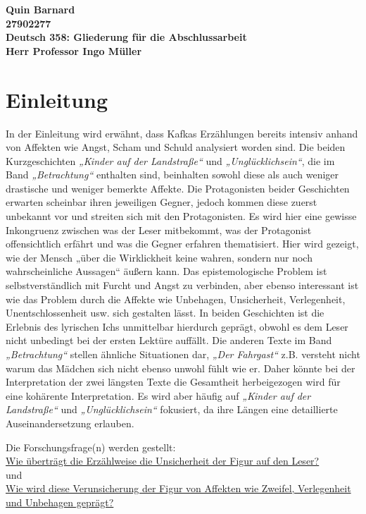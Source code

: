 \documentclass[12pt,a4paper]{article}
\begin{document}
\onehalfspacing


\noindent
\textbf{%
    Quin Barnard\\
    27902277\\
    Deutsch 358: Gliederung für die Abschlussarbeit\\
    Herr Professor Ingo Müller
}

\par
\section{Einleitung}
In der Einleitung wird erwähnt, dass Kafkas Erzählungen bereits intensiv anhand von Affekten wie Angst, Scham und Schuld analysiert worden sind. Die beiden Kurzgeschichten \textit{„Kinder auf der Landstraße“} und \textit{„Unglücklichsein“}, die im Band \textit{„Betrachtung“} enthalten sind, beinhalten sowohl diese als auch weniger drastische und weniger bemerkte Affekte. Die Protagonisten beider Geschichten erwarten scheinbar ihren jeweiligen Gegner, jedoch kommen diese zuerst unbekannt vor und streiten sich mit den Protagonisten. Es wird hier eine gewisse Inkongruenz zwischen was der Leser mitbekommt, was der Protagonist offensichtlich erfährt und was die Gegner erfahren thematisiert. Hier wird gezeigt, wie der Mensch „über die Wirklickheit keine wahren, sondern nur noch wahrscheinliche Aussagen“\autocite[137]{horstkotte2014} äußern kann. Das epistemologische Problem ist selbstverständlich mit Furcht und Angst zu verbinden, aber ebenso interessant ist wie das Problem durch die Affekte wie Unbehagen, Unsicherheit, Verlegenheit, Unentschlossenheit usw. sich gestalten lässt. In beiden Geschichten ist die Erlebnis des lyrischen Ichs unmittelbar hierdurch geprägt, obwohl es dem Leser nicht unbedingt bei der ersten Lektüre auffällt. Die anderen Texte im Band \textit{„Betrachtung“} stellen ähnliche Situationen dar, \textit{„Der Fahrgast“} z.B. versteht nicht warum das Mädchen sich nicht ebenso unwohl fühlt wie er. Daher könnte bei der Interpretation der zwei längsten Texte die Gesamtheit herbeigezogen wird für eine kohärente Interpretation. Es wird aber häufig auf \textit{„Kinder auf der Landstraße“} und \textit{„Unglücklichsein“} fokusiert, da ihre Längen eine detaillierte Auseinandersetzung erlauben.\par Die Forschungsfrage(n) werden gestellt:\\ \uline{Wie überträgt die Erzählweise die Unsicherheit der Figur auf den Leser?}\\ und\\ \uline{Wie wird diese Verunsicherung der Figur von Affekten wie Zweifel, Verlegenheit und Unbehagen geprägt?}
\end{document}
